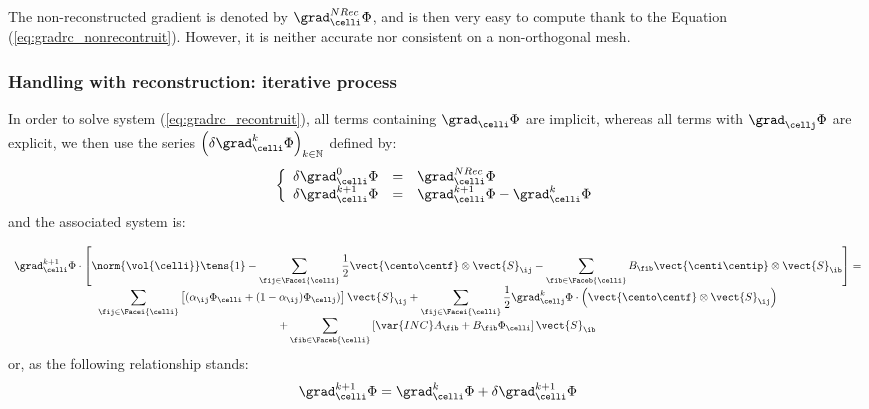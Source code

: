 \begin{remark}
The non-reconstructed gradient is denoted by $ \grad_\celli^{NRec} \Phi  $, and is then 
very easy to compute thank to the Equation (\ref{eq:gradrc_nonrecontruit}).
However, it is neither accurate nor consistent on a non-orthogonal mesh.
\end{remark}

\subsubsection{Handling with reconstruction: iterative process}

In order to solve system (\ref{eq:gradrc_recontruit}), all terms containing $\grad_\celli \Phi$ are implicit, whereas 
all terms with $\grad_\cellj \Phi$ are explicit, we then use the series $\left( \delta \grad_\celli^k \Phi \right)_{k \in \mathbb{N}}$ defined by:
%
\begin{equation}
\left\{\begin{array}{r c l}
\delta \grad_\celli^0 \Phi &=& \grad_\celli^{NRec} \Phi \\
\delta \grad_\celli^{k+1} \Phi &= &\grad_\celli^{k+1} \Phi - \grad_\celli^k \Phi
\end{array}\right.
\end{equation}
%
and the associated system is:

\begin{equation}\label{eq:gradrc_recontruit_comp2}
\begin{array}{c}
\displaystyle
\grad_{\celli}^{k+1} \Phi \cdot \left[\norm{\vol{\celli}} \tens{1} - 
\sum\limits_{ \fij \in \Facei{\celli}} \frac{1}{2}  \vect{\cento \centf} \otimes \vect{S}_{\ij} -
\sum\limits_{ \fib \in \Faceb{\celli}} B_{\fib} \vect{\centi \centip}  \otimes \vect{S}_{\ib}  \right]
= \\
\displaystyle
\sum\limits_{\fij \in \Facei{\celli}}\left[
(\alpha_{\ij} \Phi_\celli + (1 - \alpha_{\ij}) \Phi_\cellj)\right] \vect{S}_{\ij}+
\sum\limits_{\fij \in \Facei{\celli}} \frac{1}{2} \grad_\cellj^k \Phi \cdot \left( \vect{\cento \centf} \otimes \vect{S}_{\ij} \right) \\
\displaystyle +
\sum\limits_{\fib \in \Faceb{\celli}}\left[ \var{INC} A_{\fib} + B_{\fib} \Phi_\celli \right] \vect{S}_{\ib}
\end{array}
\end{equation}
%
or, as the following relationship stands:
\begin{equation*}
 \grad_\celli^{k+1} \Phi = \grad_\celli^k \Phi+ \delta \grad_\celli^{k+1} \Phi
\end{equation*}

